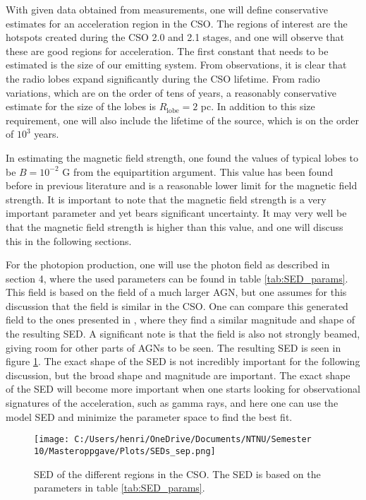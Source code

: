 With given data obtained from measurements, one will define conservative estimates for an acceleration region in the CSO. The regions of interest are the hotspots created during the CSO 2.0 and 2.1 stages, and one will observe that these are good regions for acceleration. The first constant that needs to be estimated is the size of our emitting system. From observations, it is clear that the radio lobes expand significantly during the CSO lifetime. From radio variations, which are on the order of tens of years, a reasonably conservative estimate for the size of the lobes is $R_{\text{lobe}} = 2$ pc. In addition to this size requirement, one will also include the lifetime of the source, which is on the order of $10^3$ years.

In estimating the magnetic field strength, one found the values of typical lobes to be $B = 10^{-2}$ G from the equipartition argument. This value has been found before in previous literature and is a reasonable lower limit for the magnetic field strength. It is important to note that the magnetic field strength is a very important parameter and yet bears significant uncertainty. It may very well be that the magnetic field strength is higher than this value, and one will discuss this in the following sections.

For the photopion production, one will use the photon field as described in section 4, where the used parameters can be found in table \ref{tab:SED_params}. This field is based on the field of a much larger AGN, but one assumes for this discussion that the field is similar in the CSO. One can compare this generated field to the ones presented in \cite{bronzini2024investigating}, where they find a similar magnitude and shape of the resulting SED. A significant note is that the field is also not strongly beamed, giving room for other parts of AGNs to be seen. The resulting SED is seen in figure \ref{fig:SED_sep}. The exact shape of the SED is not incredibly important for the following discussion, but the broad shape and magnitude are important. The exact shape of the SED will become more important when one starts looking for observational signatures of the acceleration, such as gamma rays, and here one can use the model SED and minimize the parameter space to find the best fit.


\begin{figure}
    \centering
    \texttt{[image: C:/Users/henri/OneDrive/Documents/NTNU/Semester 10/Masteroppgave/Plots/SEDs\_sep.png]}
    \caption{SED of the different regions in the CSO. The SED is based on the parameters in table \ref{tab:SED_params}.}
    \label{fig:SED_sep}
\end{figure}





